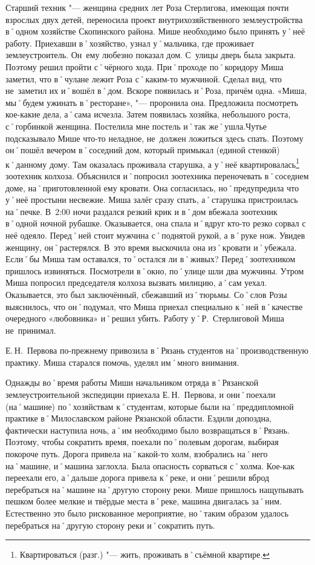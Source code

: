 Старший техник "--- женщина средних лет Роза Стерлигова, имеющая почти взрослых двух детей, переносила проект внутрихозяйственного землеустройства в˚одном хозяйстве Скопинского района. Мише необходимо было принять у˚неё работу. Приехавши в˚хозяйство, узнал у˚мальчика, где проживает землеустроитель. Он~ему любезно показал дом. С~улицы дверь была закрыта. Поэтому решил пройти с˚чёрного хода. При˚проходе по˚коридору Миша заметил, что в˚чулане лежит Роза с˚каким-то мужчиной. Сделал вид, что не~заметил их и˚вошёл в˚дом. Вскоре появилась и˚Роза, причём одна. «Миша, мы˚будем ужинать в˚ресторане»,  "--- проронила она. Предложила посмотреть кое-какие дела, а˚сама исчезла. Затем появилась хозяйка, небольшого роста, с˚горбинкой женщина. Постелила мне постель и˚так же˚ушла.Чутье подсказывало Мише что-то неладное, не~должен ложиться здесь спать. Поэтому он˚пошёл вечером в˚соседний дом, который примыкал (единой стенкой) к˚данному дому. Там оказалась проживала старушка, а у˚неё квартировалась\footnote{Квартироваться (разг.) "--- жить, проживать в˚съёмной квартире.} зоотехник колхоза. Объяснился и˚попросил зоотехника переночевать в˚соседнем доме, на˚приготовленной ему кровати. Она согласилась, но˚предупредила что у˚неё простыни несвежие. Миша залёг сразу спать, а˚старушка пристроилась на˚печке. В~2:00 ночи раздался резкий крик и в˚дом вбежала зоотехник в˚одной ночной рубашке. Оказывается, она спала и˚вдруг кто-то резко сорвал с неё одеяло. Перед˚ней стоит мужчина с˚поднятой рукой, а в˚руке нож. Увидев женщину, он˚растерялся. В~это время выскочила она из˚кровати и˚убежала. Если˚бы Миша там оставался, то˚остался ли в˚живых? Перед˚зоотехником пришлось извиняться. Посмотрели в˚окно, по˚улице шли два мужчины. Утром Миша попросил председателя колхоза вызвать милицию, а˚сам уехал. Оказывается, это был заключённый, сбежавший из˚тюрьмы. Со˚слов Розы выяснилось, что он˚подумал, что Миша приехал специально к˚ней в˚качестве очередного «любовника» и˚решил убить. Работу у˚Р.~Стерлиговой Миша не~принимал.

Е.\,Н.~Первова по-прежнему привозила в˚Рязань студентов на˚производственную практику. Миша старался помочь, уделял им˚много внимания.

Однажды во˚время работы Миши начальником отряда в˚Рязанской землеустроительной экспедиции приехала Е.\,Н.~Первова, и они˚поехали (на˚машине) по˚хозяйствам к˚студентам, которые были на˚преддипломной практике в˚Милославском районе Рязанской области. Ездили допоздна, фактически наступила ночь, а˚им необходимо было возвращаться в˚Рязань. Поэтому, чтобы сократить время, поехали по˚полевым дорогам, выбирая покороче путь. Дорога привела на˚какой-то холм, взобрались на˚него на˚машине, и˚машина заглохла. Была опасность сорваться с˚холма. Кое-как переехали его, а˚дальше дорога привела к˚реке, и они˚решили вброд перебраться на˚машине на˚другую сторону реки. Мише пришлось нащупывать пешком более мелкие и твёрдые места в˚реке, машина двигалась за˚ним. Естественно это было рискованное мероприятие, но˚таким образом удалось перебраться на˚другую сторону реки и˚сократить путь. 

